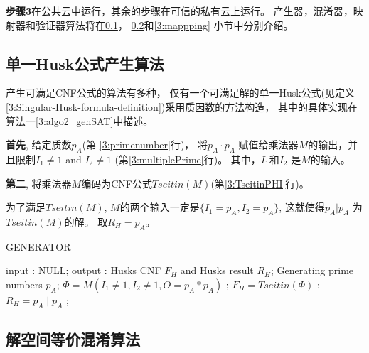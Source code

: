 \textbf{步骤3}在公共云中运行，其余的步骤在可信的私有云上运行。
%
产生器，混淆器，映射器和验证器算法将在\ref{3:genhusk}， \ref{3:obfuscating}和\ref{3:mappping} 小节中分别介绍。
\subsection{单一Husk公式产生算法}\label{3:genhusk}

产生可满足CNF公式的算法有多种\cite{microgenSAT,genSAT}，
仅有一个可满足解的单一Husk公式(见定义\ref{3:Singular-Husk-formula-definition})采用质因数的方法构造\cite{genSAT}，
其中的具体实现在算法一\ref{3:algo2_genSAT}中描述。

\textbf{首先},
给定质数$p_A$(第 \ref{3:primenumber}行)，
将$p_A \cdot p_A$ 赋值给乘法器$M$的输出，并且限制$I_1\ne 1$ and  $I_2\ne 1$ (第\ref{3:multiplePrime}行)。
其中，$I_1$和$I_2$ 是$M$的输入。

\textbf{第二},
将乘法器$M$编码为CNF公式$Tseitin(M)$(第\ref{3:TseitinPHI}行)。

为了满足$Tseitin(M)$, $M$的两个输入一定是$\{I_1=p_A,I_2=p_A\}$,
这就使得$p_A|p_A$ 为$Tseitin(M)$的解。
取$R_H=p_A$。

%
 \begin{algorithm}[t]
 \caption{GENERATOR}
 \label{3:algo2_genSAT}
 \begin{algorithmic}[1]
 \STATE input : NULL;
 \STATE output : Husks CNF $F_H$ and Husks result $R_H$;
 \STATE Generating prime numbers $p_A$; \label{3:primenumber}
 \STATE $\Phi= M(I_1 \neq 1, I_2\neq 1, O=p_A*p_A)$ ;\label{3:multiplePrime}
 \STATE $F_H=Tseitin(\Phi)$ ;\label{3:TseitinPHI}
 \STATE $R_H=p_A\mid p_A$ ;
 \end{algorithmic}
 \end{algorithm}

\subsection{解空间等价混淆算法}\label{3:obfuscating}



